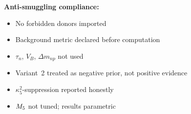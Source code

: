 \begin{resultbox}[title=N2 WP2 Summary]
\textbf{Anti-smuggling compliance:}
\begin{itemize}
    \item[$\checkmark$] No forbidden donors imported
    \item[$\checkmark$] Background metric declared before computation
    \item[$\checkmark$] $\tau_n$, $V_B$, $\Delta m_{np}$ not used
    \item[$\checkmark$] Variant~2 treated as negative prior, not positive evidence
    \item[$\checkmark$] $\kappa_5^2$-suppression reported honestly
    \item[$\checkmark$] $M_5$ not tuned; results parametric
\end{itemize}
\end{resultbox}
